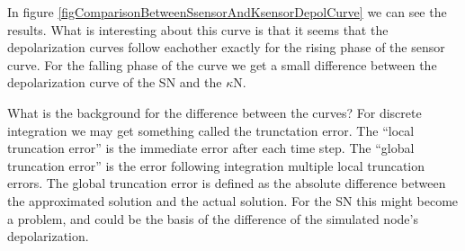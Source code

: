 In figure \ref{figComparisonBetweenSsensorAndKsensorDepolCurve} we can see the results. 
What is interesting about this curve is that it seems that the depolarization curves follow eachother exactly %
for the rising phase of the sensor curve. 
For the falling phase of the curve we get a small difference between the depolarization curve of the SN and the $\kappa$N.

What is the background for the difference between the curves?
For discrete integration we may get something called the trunctation error. 
The ``local truncation error'' is the immediate error after each time step. 
The ``global truncation error'' is the error following integration multiple local truncation errors. 
The global truncation error is defined as the absolute difference between the approximated solution and the actual solution. 
For the SN this might become a problem, and could be the basis of the difference of the simulated node's depolarization.%






